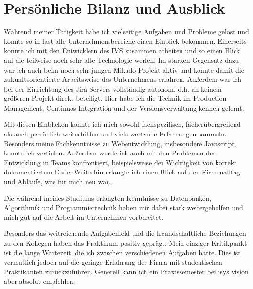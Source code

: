 \chapter{Persönliche Bilanz und Ausblick}
\label{ch:fazit}

Während meiner Tätigkeit habe ich vielseitige Aufgaben und Probleme gelöst und konnte so in fast alle Unternehmensbereiche einen Einblick bekommen. Einerseits konnte ich mit den Entwicklern des IVS zusammen arbeiten und so einen Blick auf die teilweise noch sehr alte Technologie werfen. Im starken Gegensatz dazu war ich auch beim noch sehr jungen Mikado-Projekt aktiv und konnte damit die zukunftsorientierte Arbeitsweise des Unternehmens erfahren. Außerdem war ich bei der Einrichtung des Jira-Servers vollständig autonom, d.h. an keinem größeren Projekt direkt beteiligt. Hier habe ich die Technik im Production Management, Continuos Integration und der Versionsverwaltung kennen gelernt.

Mit diesen Einblicken konnte ich mich sowohl fachspezifisch, fächerübergreifend als auch persönlich weiterbilden und viele wertvolle Erfahrungen sammeln. Besonders meine Fachkenntnisse zu Webentwicklung, insbesondere Javascript, konnte ich vertiefen. Außerdem wurde ich auch mit den Problemen der Entwicklung in Teams konfrontiert, beispielsweise der Wichtigkeit von korrekt dokumentiertem Code. Weiterhin erlangte ich einen Blick auf den Firmenalltag und Abläufe, was für mich neu war.

Die während meines Studiums erlangten Kenntnisse zu Datenbanken, Algorithmik und Programmiertechnik haben mir dabei stark weitergeholfen und mich gut auf die Arbeit im Unternehmen vorbereitet.

Besonders das weitreichende Aufgabenfeld und die freundschaftliche Beziehungen zu den Kollegen haben das Praktikum positiv geprägt. Mein einziger Kritikpunkt ist die lange Wartezeit, die ich zwischen verschiedenen Aufgaben hatte. Dies ist vermutlich jedoch auf die geringe Erfahrung der Firma mit studentischen Praktikanten zurückzuführen. Generell kann ich ein Praxissemester bei isys vision aber absolut empfehlen.
